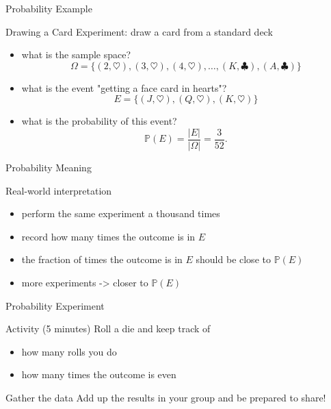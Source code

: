 \documentclass{beamer}
\begin{document}
\begin{frame}{Probability Example}
  \begin{block}{Drawing a Card}
    Experiment: draw a card from a standard deck
    \begin{itemize}
\pause
      \item what is the sample space?
\pause
        $$\Omega = \{(2,\heartsuit),(3,\heartsuit),(4,\heartsuit),\dots,(K,\clubsuit),(A,\clubsuit)\}$$
\pause
      \item what is the event "getting a face card in hearts"?
\pause
        $$E = \{(J,\heartsuit),(Q,\heartsuit),(K,\heartsuit)\}$$
\pause
      \item what is the probability of this event?
\pause
        $$\mathbb{P}(E) = \frac{|E|}{|\Omega|} = \frac{3}{52}.$$
    \end{itemize}
  \end{block}
\end{frame}

\begin{frame}{Probability Meaning}
  \begin{block}{Real-world interpretation}
    \begin{itemize}
\pause
      \item perform the same experiment a thousand times
\pause
      \item record how many times the outcome is in $E$
\pause
      \item the fraction of times the outcome is in $E$ should be close to $\mathbb P(E)$
\pause
      \item more experiments -> closer to $\mathbb P(E)$
    \end{itemize}
  \end{block}
\end{frame}

\begin{frame}{Probability Experiment}
  \begin{block}{Activity (5 minutes)}
    Roll a die and keep track of 
    \begin{itemize}
      \item how many rolls you do
      \item how many times the outcome is even
    \end{itemize}
  \end{block}
\pause
  \begin{block}{Gather the data}
    Add up the results in your group and be prepared to share!
  \end{block}
\end{frame}
\end{document}

